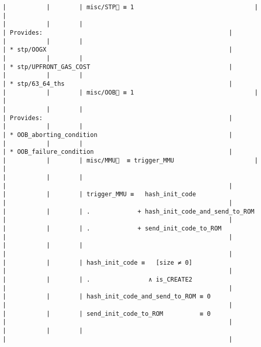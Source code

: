 \documentclass[varwidth=\maxdimen,margin=0.5cm,multi={verbatim}]{standalone}
\begin{document}
\begin{verbatim}
|           |        | misc/STP🚩 ≡ 1                                 |                                                             |
|           |        |                                                | Provides:                                                   |
|           |        |                                                | * stp/OOGX                                                  |
|           |        |                                                | * stp/UPFRONT_GAS_COST                                      |
|           |        |                                                | * stp/63_64_ths                                             |
|           |        | misc/OOB🚩 ≡ 1                                 |                                                             |
|           |        |                                                | Provides:                                                   |
|           |        |                                                | * OOB_aborting_condition                                    |
|           |        |                                                | * OOB_failure_condition                                     |
|           |        | misc/MMU🚩  ≡ trigger_MMU                      |                                                             |
|           |        |                                                |                                                             |
|           |        | trigger_MMU ≡   hash_init_code                 |                                                             |
|           |        | .             + hash_init_code_and_send_to_ROM |                                                             |
|           |        | .             + send_init_code_to_ROM          |                                                             |
|           |        |                                                |                                                             |
|           |        | hash_init_code ≡   [size ≠ 0]                  |                                                             |
|           |        | .                ∧ is_CREATE2                  |                                                             |
|           |        | hash_init_code_and_send_to_ROM ≡ 0             |                                                             |
|           |        | send_init_code_to_ROM          ≡ 0             |                                                             |
|           |        |                                                |                                                             |

\end{verbatim}
\end{document}
